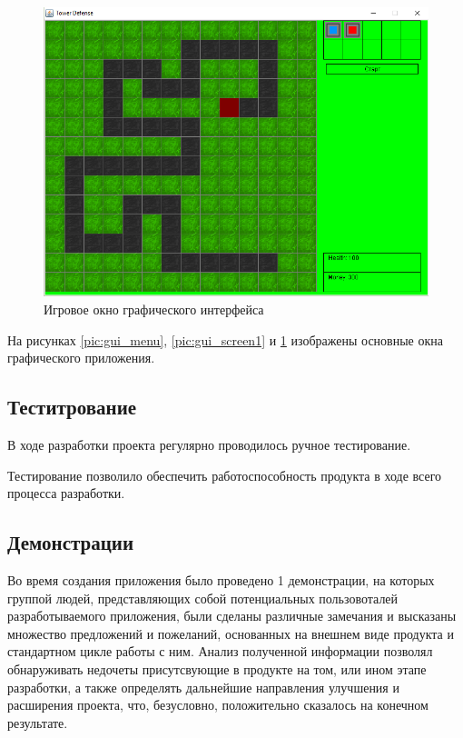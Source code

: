 \begin{figure}[H]
	\begin{center}
		\includegraphics[width=1\textwidth]{../image/GameScreen1.png}
		\caption{Игровое окно графического интерфейса}
		\label{pic:gui_screen2}
	\end{center}
\end{figure} 



На рисунках \ref{pic:gui_menu}, \ref{pic:gui_screen1} и \ref{pic:gui_screen2} изображены основные окна графического приложения. 

\subsection{Теститрование}

В ходе разработки проекта регулярно проводилось ручное тестирование.

Тестирование позволило обеспечить работоспособность продукта в ходе всего процесса разработки. 

\subsection{Демонстрации}

Во время создания приложения было проведено 1 демонстрации, на которых группой людей, представляющих собой потенциальных пользовоталей разработываемого приложения, были сделаны различные замечания и высказаны множество предложений и пожеланий, основанных на внешнем виде продукта и стандартном цикле работы с ним. Анализ полученной информации позволял обнаруживать недочеты присутсвующие в продукте на том, или ином этапе разработки, а также определять дальнейшие направления улучшения и расширения проекта, что, безусловно, положительно сказалось на конечном результате.

